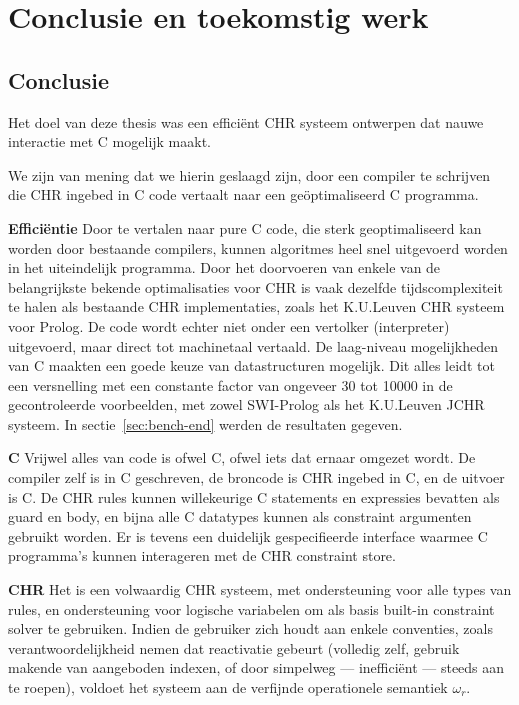\chapter{Conclusie en toekomstig werk} \label{chap:concl}

\section{Conclusie} \label{sec:concl}

Het doel van deze thesis was een effici\"ent CHR systeem ontwerpen dat nauwe interactie met C mogelijk maakt.

We zijn van mening dat we hierin geslaagd zijn, door een compiler te schrijven die CHR ingebed in C code vertaalt naar een ge\"optimaliseerd C programma.

{\bf Effici\"entie} Door te vertalen naar pure C code, die sterk geoptimaliseerd kan worden door bestaande compilers, kunnen algoritmes heel snel uitgevoerd worden in het uiteindelijk programma. Door het doorvoeren van enkele van de belangrijkste bekende optimalisaties voor CHR is vaak dezelfde tijdscomplexiteit te halen als bestaande CHR implementaties, zoals het K.U.Leuven CHR systeem voor Prolog. De code wordt echter niet onder een vertolker (interpreter) uitgevoerd, maar direct tot machinetaal vertaald. De laag-niveau mogelijkheden van C maakten een goede keuze van datastructuren mogelijk. Dit alles leidt tot een versnelling met een constante factor van ongeveer 30 tot 10000 in de gecontroleerde voorbeelden, met zowel SWI-Prolog als het K.U.Leuven JCHR systeem. In sectie~\ref{sec:bench-end} werden de resultaten gegeven.

{\bf C} Vrijwel alles van code is ofwel C, ofwel iets dat ernaar omgezet wordt. De compiler zelf is in C geschreven, de broncode is CHR ingebed in C, en de uitvoer is C. De CHR rules kunnen willekeurige C statements en expressies bevatten als guard en body, en bijna alle C datatypes kunnen als constraint argumenten gebruikt worden. Er is tevens een duidelijk gespecifieerde interface waarmee C programma's kunnen interageren met de CHR constraint store.

{\bf CHR} Het is een volwaardig CHR systeem, met ondersteuning voor alle types van rules, en ondersteuning voor logische variabelen om als basis built-in constraint solver te gebruiken. Indien de gebruiker zich houdt aan enkele conventies, zoals verantwoordelijkheid nemen dat reactivatie gebeurt (volledig zelf, gebruik makende van aangeboden indexen, of door simpelweg --- ineffici\"ent --- steeds  aan te roepen), voldoet het systeem aan de verfijnde operationele semantiek $\omega_r$.

